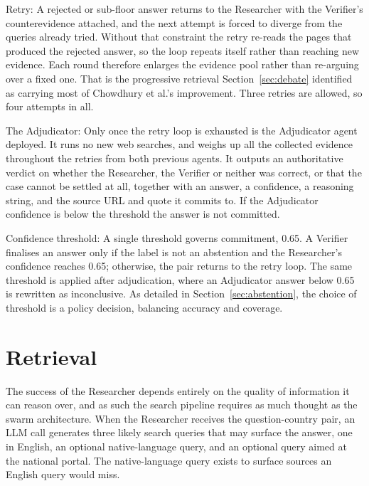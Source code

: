 Retry: A rejected or sub-floor answer returns to the Researcher with the Verifier's counterevidence attached, and the next attempt is forced to diverge from the queries already tried. Without that constraint the retry re-reads the pages that produced the rejected answer, so the loop repeats itself rather than reaching new evidence. Each round therefore enlarges the evidence pool rather than re-arguing over a fixed one. That is the progressive retrieval Section~\ref{sec:debate} identified as carrying most of Chowdhury et al.'s improvement. Three retries are allowed, so four attempts in all.

The Adjudicator: Only once the retry loop is exhausted is the Adjudicator agent deployed. It runs no new web searches, and weighs up all the collected evidence throughout the retries from both previous agents. It outputs an authoritative verdict on whether the Researcher, the Verifier or neither was correct, or that the case cannot be settled at all, together with an answer, a confidence, a reasoning string, and the source URL and quote it commits to. If the Adjudicator confidence is below the threshold the answer is not committed.

Confidence threshold: A single threshold governs commitment, 0.65. A Verifier finalises an answer only if the label is not an abstention and the Researcher's confidence reaches 0.65; otherwise, the pair returns to the retry loop. The same threshold is applied after adjudication, where an Adjudicator answer below 0.65 is rewritten as inconclusive. As detailed in Section~\ref{sec:abstention}, the choice of threshold is a policy decision, balancing accuracy and coverage.

\section{Retrieval}\label{sec:retrieval}

The success of the Researcher depends entirely on the quality of information it can reason over, and as such the search pipeline requires as much thought as the swarm architecture. When the Researcher receives the question-country pair, an LLM call generates three likely search queries that may surface the answer, one in English, an optional native-language query, and an optional query aimed at the national portal. The native-language query exists to surface sources an English query would miss.

